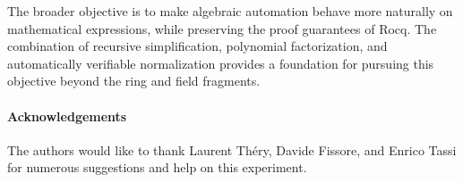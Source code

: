 \documentclass{jflart}
\begin{document}
The broader objective is to make algebraic automation behave more
naturally on mathematical expressions, while preserving the
proof guarantees of Rocq. The combination of recursive
simplification, polynomial factorization, and automatically verifiable
normalization provides a foundation for pursuing this objective
beyond the ring and field fragments.

\paragraph{Acknowledgements}  The authors would like to thank Laurent Théry,
Davide Fissore, and Enrico Tassi for numerous suggestions and help on this
experiment.



\end{document}
